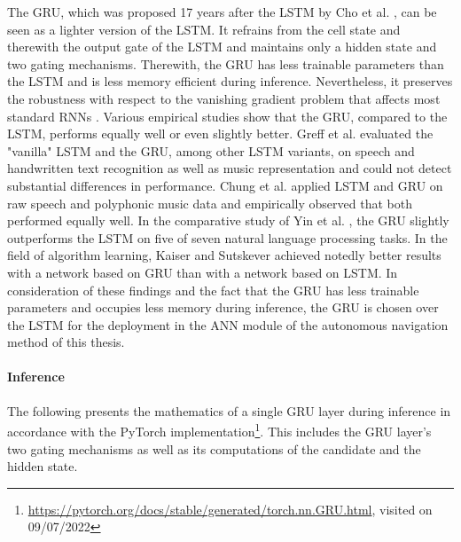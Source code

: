 The GRU,
which was proposed 17 years after the LSTM by Cho et al. \cite{Cho2014},
can be seen as a lighter version of the LSTM.
It refrains from the cell state and therewith the output gate
of the LSTM and maintains only a hidden state and two gating mechanisms.
Therewith, the GRU has less trainable parameters than the LSTM
and is less memory efficient during inference.
Nevertheless, it preserves the robustness with respect to the 
vanishing gradient problem that affects most standard RNNs \cite{ICE2020}.
Various empirical studies show that the GRU, compared to the LSTM,
performs equally well or even slightly better.
Greff et al. \cite{Greff2017} evaluated 
the "vanilla" LSTM and the GRU, among other LSTM variants,
on speech and handwritten text recognition
as well as music representation
and could not detect substantial differences in performance.
Chung et al. \cite{Chung2014} applied LSTM and GRU on
raw speech and polyphonic music data and empirically
observed that both performed equally well.
In the comparative study of 
Yin et al. \cite{Yin2017}, 
the GRU slightly outperforms
the LSTM on five of seven
natural language processing tasks.
In the field of algorithm learning, 
Kaiser and Sutskever \cite{Kaiser2015} achieved notedly better results 
with a network based on GRU
than with a network based on LSTM.
In consideration of these findings and the
fact that the GRU has less trainable parameters
and occupies less memory during inference,
the GRU is chosen over the LSTM for the deployment 
in the ANN module of the autonomous navigation method of this thesis.




\paragraph*{Inference}$\ $\\
The following presents the mathematics of a single GRU layer during inference
in accordance with the PyTorch implementation\footnote{
    \url{https://pytorch.org/docs/stable/generated/torch.nn.GRU.html}, visited on 09/07/2022
}.
This includes the GRU layer's two gating mechanisms
as well as its computations of the candidate and the hidden state.






